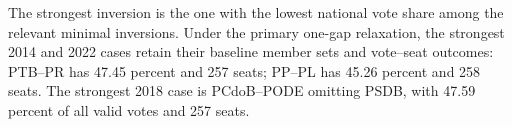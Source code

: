 \documentclass[11pt]{article}
\begin{document}



The strongest inversion is the one with the lowest national vote share among
the relevant minimal inversions. Under the primary one-gap relaxation, the
strongest 2014 and 2022 cases retain their baseline member sets and vote--seat
outcomes: PTB--PR has 47.45 percent and 257 seats; PP--PL has 45.26 percent and
258 seats. The strongest 2018 case is PCdoB--PODE omitting PSDB, with
47.59 percent of all valid votes and 257 seats.

\end{document}
